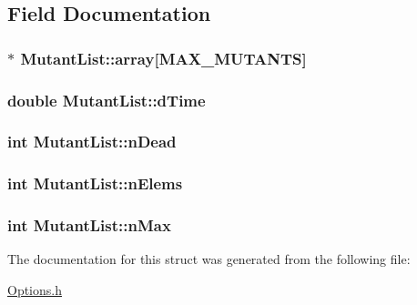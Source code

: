 \subsection{Field Documentation}
\hypertarget{structMutantList_a880314b02f26bbaebb4277d514f6d9de}{
\subsubsection[{array}]{$\ast$ Mutant\-List\-::array\mbox{[}{\bf M\-A\-X\-\_\-\-M\-U\-T\-A\-N\-T\-S}\mbox{]}}}\label{structMutantList_a880314b02f26bbaebb4277d514f6d9de}
\hypertarget{structMutantList_a43fbe4e680f5b4d1f4c001f793d2aa40}{
\subsubsection[{d\-Time}]{\setlength{\rightskip}{0pt plus 5cm}double Mutant\-List\-::d\-Time}}\label{structMutantList_a43fbe4e680f5b4d1f4c001f793d2aa40}
\hypertarget{structMutantList_a52c03779cb04c5d8a5344c70e5e39b89}{
\subsubsection[{n\-Dead}]{\setlength{\rightskip}{0pt plus 5cm}int Mutant\-List\-::n\-Dead}}\label{structMutantList_a52c03779cb04c5d8a5344c70e5e39b89}
\hypertarget{structMutantList_abfe5da02681fadfbc5c85c150a880508}{
\subsubsection[{n\-Elems}]{\setlength{\rightskip}{0pt plus 5cm}int Mutant\-List\-::n\-Elems}}\label{structMutantList_abfe5da02681fadfbc5c85c150a880508}
\hypertarget{structMutantList_a0238362172eaecea60b5cc88e4406f8f}{
\subsubsection[{n\-Max}]{\setlength{\rightskip}{0pt plus 5cm}int Mutant\-List\-::n\-Max}}\label{structMutantList_a0238362172eaecea60b5cc88e4406f8f}


The documentation for this struct was generated from the following file\-:\begin{DoxyCompactItemize}
\item 
\hyperlink{Options_8h}{Options.\-h}\end{DoxyCompactItemize}
